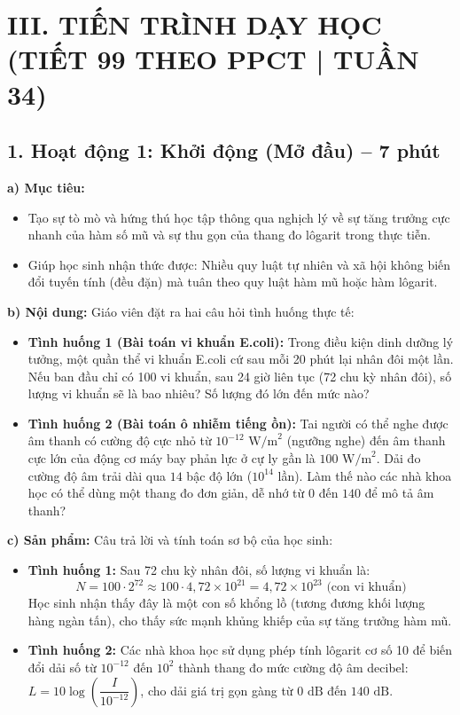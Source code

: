 \documentclass[12pt, a4paper]{article}
\begin{document}
\section*{III. TIẾN TRÌNH DẠY HỌC (TIẾT 99 THEO PPCT | TUẦN 34)}

\subsection*{1. Hoạt động 1: Khởi động (Mở đầu) -- 7 phút}

\noindent \textbf{a) Mục tiêu:}
\begin{itemize}[leftmargin=0.6cm]
    \item Tạo sự tò mò và hứng thú học tập thông qua nghịch lý về sự tăng trưởng cực nhanh của hàm số mũ và sự thu gọn của thang đo lôgarit trong thực tiễn.
    \item Giúp học sinh nhận thức được: Nhiều quy luật tự nhiên và xã hội không biến đổi tuyến tính (đều đặn) mà tuân theo quy luật hàm mũ hoặc hàm lôgarit.
\end{itemize}

\noindent \textbf{b) Nội dung:}
Giáo viên đặt ra hai câu hỏi tình huống thực tế:
\begin{itemize}[leftmargin=0.6cm]
    \item \textbf{Tình huống 1 (Bài toán vi khuẩn E.coli):} Trong điều kiện dinh dưỡng lý tưởng, một quần thể vi khuẩn E.coli cứ sau mỗi 20 phút lại nhân đôi một lần. Nếu ban đầu chỉ có 100 vi khuẩn, sau 24 giờ liên tục (72 chu kỳ nhân đôi), số lượng vi khuẩn sẽ là bao nhiêu? Số lượng đó lớn đến mức nào?
    \item \textbf{Tình huống 2 (Bài toán ô nhiễm tiếng ồn):} Tai người có thể nghe được âm thanh có cường độ cực nhỏ từ $10^{-12}\text{ W/m}^2$ (ngưỡng nghe) đến âm thanh cực lớn của động cơ máy bay phản lực ở cự ly gần là $100\text{ W/m}^2$. Dải đo cường độ âm trải dài qua $14$ bậc độ lớn ($10^{14}$ lần). Làm thế nào các nhà khoa học có thể dùng một thang đo đơn giản, dễ nhớ từ $0$ đến $140$ để mô tả âm thanh?
\end{itemize}

\noindent \textbf{c) Sản phẩm:}
Câu trả lời và tính toán sơ bộ của học sinh:
\begin{itemize}[leftmargin=0.6cm]
    \item \textbf{Tình huống 1:} Sau 72 chu kỳ nhân đôi, số lượng vi khuẩn là:
    $$N = 100 \cdot 2^{72} \approx 100 \cdot 4{,}72 \times 10^{21} = 4{,}72 \times 10^{23} \text{ (con vi khuẩn)}$$
    Học sinh nhận thấy đây là một con số khổng lồ (tương đương khối lượng hàng ngàn tấn), cho thấy sức mạnh khủng khiếp của sự tăng trưởng hàm mũ.
    \item \textbf{Tình huống 2:} Các nhà khoa học sử dụng phép tính lôgarit cơ số 10 để biến đổi dải số từ $10^{-12}$ đến $10^2$ thành thang đo mức cường độ âm decibel: $L = 10 \log\left(\dfrac{I}{10^{-12}}\right)$, cho dải giá trị gọn gàng từ $0\text{ dB}$ đến $140\text{ dB}$.
\end{itemize}
\end{document}
